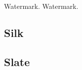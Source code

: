 \subsection{\mat}

\renewcommand{\Number}{01}\InputImage{\sfl}{\tsm}{\sro}{\tbu}{\sro}{\tbu}
{}{}
\renewcommand{\Number}{02}\InputImage{\sfl}{\tco}{\sro}{\tbu}{\sro}{\tbu}
{}{}
\renewcommand{\Number}{03}\InputImage{\sfl}{\tsm}{\sro}{\tbu}{\sro}{\tbu}
{}{}
\renewcommand{\Number}{04}\InputImage{\sfl}{\tsm}{\sro}{\tbu}{\sro}{\tbu}
{}{}
\renewcommand{\Number}{05}\InputImage{\sfl}{\tsm}{\sro}{\tbu}{\sro}{\tbu}
{}{}
\renewcommand{\Number}{06}\InputImage{\sfl}{\tsm}{\sro}{\tbu}{\sro}{\tbu}
{Watermark.}{}
\renewcommand{\Number}{07}\InputImage{\sfl}{\tsm}{\sro}{\tbu}{\sro}{\tbu}
{Watermark.}{}
\renewcommand{\Number}{08}\InputImage{\sfl}{\tsm}{\sro}{\tbu}{\sro}{\tbu}
{}{}
\renewcommand{\Number}{09}\InputImage{\sfl}{\tsm}{\sro}{\tbu}{\sro}{\tbu}
{}{}
\renewcommand{\Number}{10}\InputImage{\sfl}{\tsm}{\sro}{\tbu}{\sro}{\tbu}
{}{}
\renewcommand{\Number}{11}\InputImage{\sfl}{\tsm}{\sro}{\tbu}{\sro}{\tbu}
{}{}
\renewcommand{\Number}{12}\InputImage{\sfl}{\tsm}{\sro}{\tbu}{\sro}{\tbu}
{}{}

\clearpage
\renewcommand{\mat}{Silk}
\subsection{\mat}

\renewcommand{\Number}{01}\InputImage{\sfl}{\tsm}{\sfl}{\tsm}{\sexdi}{\tbu}
{}{}
\renewcommand{\Number}{02}\InputImage{\sfl}{\tsm}{\sfl}{\tsm}{\sexdi}{\tbu}
{}{}
\renewcommand{\Number}{03}\InputImage{\sfl}{\tsm}{\sfl}{\tsm}{\sexdi}{\tbu}
{}{}
\renewcommand{\Number}{04}\InputImage{\sexor}{\tsm}{\sfl}{\tsm}{\sexdi}{\tbu}
{}{}
\renewcommand{\Number}{05}\InputImage{\sfl}{\tsm}{\sfl}{\tsm}{\sexdi}{\tbu}
{}{}
\renewcommand{\Number}{06}\InputImage{\sfl}{\tsm}{\sfl}{\tsm}{\sexdi}{\tbu}
{}{}
\renewcommand{\Number}{07}\InputImage{\sfl}{\tsm}{\sfl}{\tsm}{\sexdi}{\tbu}
{}{}
\renewcommand{\Number}{08}\InputImage{\sfl}{\tsm}{\sfl}{\tsm}{\sexdi}{\tbu}
{}{}
\renewcommand{\Number}{09}\InputImage{\sfl}{\tsm}{\sfl}{\tsm}{\sexdi}{\tbu}
{}{}
\renewcommand{\Number}{10}\InputImage{\sexor}{\tsm}{\sfl}{\tsm}{\sexdi}{\tbu}
{}{}
\renewcommand{\Number}{11}\InputImage{\sfl}{\tsm}{\sfl}{\tsm}{\sexdi}{\tbu}
{}{}
\renewcommand{\Number}{12}\InputImage{\sfl}{\tsm}{\sfl}{\tsm}{\sexdi}{\tbu}
{}{}

\clearpage
\renewcommand{\mat}{Slate}
\subsection{\mat}

